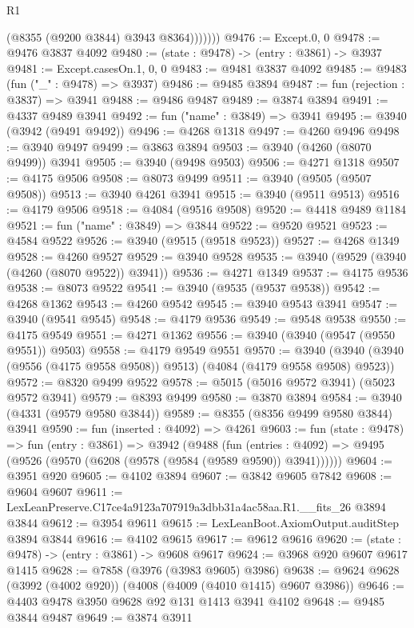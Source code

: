 \begin{lexlean}{R1}
\begin{coremodule}
                (@8355 (@9200 @3844) @3943 @8364)))))))
@9476 := Except.{0, 0}
@9478 := @9476 @3837 @4092
@9480 := (state : @9478) -> (entry : @3861) -> @3937
@9481 := Except.casesOn.{1, 0, 0}
@9483 := @9481 @3837 @4092
@9485 := @9483 (fun ("_" : @9478) => @3937)
@9486 := @9485 @3894
@9487 := fun (rejection : @3837) => @3941
@9488 := @9486 @9487
@9489 := @3874 @3894
@9491 := @4337 @9489 @3941
@9492 := fun ("name" : @3849) => @3941
@9495 := @3940 (@3942 (@9491 @9492))
@9496 := @4268 @1318
@9497 := @4260 @9496
@9498 := @3940 @9497
@9499 := @3863 @3894
@9503 := @3940 (@4260 (@8070 @9499)) @3941
@9505 := @3940 (@9498 @9503)
@9506 := @4271 @1318
@9507 := @4175 @9506
@9508 := @8073 @9499
@9511 := @3940 (@9505 (@9507 @9508))
@9513 := @3940 @4261 @3941
@9515 := @3940 (@9511 @9513)
@9516 := @4179 @9506
@9518 := @4084 (@9516 @9508)
@9520 := @4418 @9489 @1184
@9521 := fun ("name" : @3849) => @3844
@9522 := @9520 @9521
@9523 := @4584 @9522
@9526 := @3940 (@9515 (@9518 @9523))
@9527 := @4268 @1349
@9528 := @4260 @9527
@9529 := @3940 @9528
@9535 := @3940 (@9529 (@3940 (@4260 (@8070 @9522)) @3941))
@9536 := @4271 @1349
@9537 := @4175 @9536
@9538 := @8073 @9522
@9541 := @3940 (@9535 (@9537 @9538))
@9542 := @4268 @1362
@9543 := @4260 @9542
@9545 := @3940 @9543 @3941
@9547 := @3940 (@9541 @9545)
@9548 := @4179 @9536
@9549 := @9548 @9538
@9550 := @4175 @9549
@9551 := @4271 @1362
@9556 := @3940 (@3940 (@9547 (@9550 @9551)) @9503)
@9558 := @4179 @9549 @9551
@9570 := @3940 (@3940 (@3940 (@9556 (@4175 @9558 @9508)) @9513) (@4084 (@4179 @9558 @9508) @9523))
@9572 := @8320 @9499 @9522
@9578 := @5015 (@5016 @9572 @3941) (@5023 @9572 @3941)
@9579 := @8393 @9499
@9580 := @3870 @3894
@9584 := @3940 (@4331 (@9579 @9580 @3844))
@9589 := @8355 (@8356 @9499 @9580 @3844) @3941
@9590 := fun (inserted : @4092) => @4261
@9603 := fun (state : @9478) =>
  fun (entry : @3861) =>
  @3942
    (@9488
      (fun (entries : @4092) => @9495 (@9526 (@9570 (@6208 (@9578 (@9584 (@9589 @9590)) @3941))))))
@9604 := @3951 @920
@9605 := @4102 @3894
@9607 := @3842 @9605 @7842
@9608 := @9604 @9607
@9611 := LexLeanPreserve.C17ce4a9123a707919a3dbb31a4ac58aa.R1.__fits_26 @3894 @3844
@9612 := @3954 @9611
@9615 := LexLeanBoot.AxiomOutput.auditStep @3894 @3844
@9616 := @4102 @9615
@9617 := @9612 @9616
@9620 := (state : @9478) -> (entry : @3861) -> @9608 @9617
@9624 := @3968 @920 @9607 @9617 @1415
@9628 := @7858 (@3976 (@3983 @9605) @3986)
@9638 := @9624 @9628 (@3992 (@4002 @920)) (@4008 (@4009 (@4010 @1415) @9607 @3986))
@9646 := @4403 @9478 @3950 @9628 @92 @131 @1413 @3941 @4102
@9648 := @9485 @3844 @9487
@9649 := @3874 @3911

\end{coremodule}
\end{lexlean}
